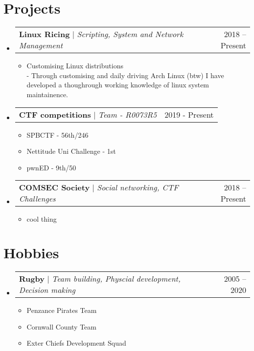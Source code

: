 \documentclass[letterpaper,11pt]{article}
\makeatletter
\newcommand{\resumeItem}[1]{
  \item\small{
    {#1 \vspace{-2pt}}
  }
}
\newcommand{\resumeProjectHeading}[2]{
    \item
    \begin{tabular*}{0.97\textwidth}{l@{\extracolsep{\fill}}r}
      \small#1 & #2 \\
    \end{tabular*}\vspace{-7pt}
}
\newcommand{\resumeSubHeadingListStart}{\begin{itemize}[leftmargin=0.15in, label={}]}
\newcommand{\resumeSubHeadingListEnd}{\end{itemize}}
\newcommand{\resumeItemListStart}{\begin{itemize}}
\newcommand{\resumeItemListEnd}{\end{itemize}\vspace{-5pt}}
\makeatother
\begin{document}
\section{Projects}

    \resumeSubHeadingListStart
      \resumeProjectHeading
          {\textbf{Linux Ricing} $|$ \emph{Scripting, System and Network Management}}{2018 -- Present}
          \resumeItemListStart
            \resumeItem{Customising Linux distributions}\\
            - Through customising and daily driving Arch Linux (btw) I have developed a thoughrough working knowledge of linux system maintainence.
          \resumeItemListEnd
      \resumeProjectHeading
          {\textbf{CTF competitions} $|$ \emph{Team - R0073R5}}{2019 - Present}
          \resumeItemListStart
            \resumeItem{SPBCTF - 56th/246}
            \resumeItem{Nettitude Uni Challenge - 1st}
            \resumeItem{pwnED - 9th/50}
          \resumeItemListEnd
      \resumeProjectHeading
          {\textbf{COMSEC Society} $|$ \emph{Social networking, CTF Challenges}}{2018 -- Present}
          \resumeItemListStart
            \resumeItem{cool thing}\\
          \resumeItemListEnd


    \resumeSubHeadingListEnd


    \section{Hobbies}

    \resumeSubHeadingListStart
      \resumeProjectHeading
          {\textbf{Rugby} $|$ \emph{Team building, Physcial development, Decision making}}{2005 -- 2020}
          \resumeItemListStart
            \resumeItem{Penzance Pirates Team}
            \resumeItem{Cornwall County Team}
            \resumeItem{Exter Chiefs Development Squad}
          \resumeItemListEnd


    \resumeSubHeadingListEnd
\end{document}
